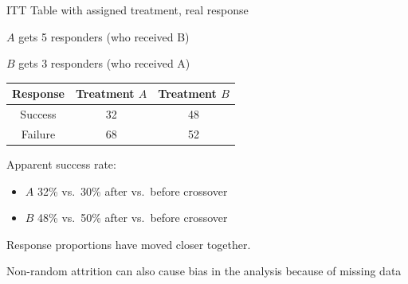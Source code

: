 \documentclass[ignorenonframetext,]{beamer}
\begin{document}
\begin{frame}{ITT Table with assigned treatment, real response}

\(A\) gets 5 responders (who received B)

\(B\) gets 3 responders (who received A)

\begin{longtable}[]{@{}ccc@{}}
\toprule
\begin{minipage}[b]{0.15\columnwidth}\centering\strut
Response\strut
\end{minipage} & \begin{minipage}[b]{0.22\columnwidth}\centering\strut
Treatment \(A\)\strut
\end{minipage} & \begin{minipage}[b]{0.25\columnwidth}\centering\strut
Treatment \(B\)\strut
\end{minipage}\tabularnewline
\midrule
\endhead
\begin{minipage}[t]{0.15\columnwidth}\centering\strut
Success\strut
\end{minipage} & \begin{minipage}[t]{0.22\columnwidth}\centering\strut
32\strut
\end{minipage} & \begin{minipage}[t]{0.25\columnwidth}\centering\strut
48\strut
\end{minipage}\tabularnewline
\begin{minipage}[t]{0.15\columnwidth}\centering\strut
Failure\strut
\end{minipage} & \begin{minipage}[t]{0.22\columnwidth}\centering\strut
68\strut
\end{minipage} & \begin{minipage}[t]{0.25\columnwidth}\centering\strut
52\strut
\end{minipage}\tabularnewline
\bottomrule
\end{longtable}

Apparent success rate:

\begin{itemize}
\item
  \(A\) 32\% vs.~30\% after vs.~before crossover
\item
  \(B\) 48\% vs.~50\% after vs.~before crossover
\end{itemize}

Response proportions have moved closer together.

Non-random attrition can also cause bias in the analysis because of
missing data

\end{frame}
\end{document}
